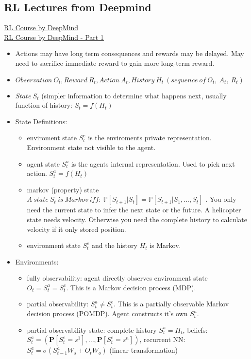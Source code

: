 \subsection{RL Lectures from Deepmind}
\href{https://www.youtube.com/watch?v=2pWv7GOvuf0&list=PLqYmG7hTraZDM-OYHWgPebj2MfCFzFObQ}{RL Course by DeepMind}
\\
\href{https://www.youtube.com/watch?v=2pWv7GOvuf0&list=PLqYmG7hTraZDM-OYHWgPebj2MfCFzFObQ}{RL Course by DeepMind - Part 1}
\begin{itemize}[noitemsep,nolistsep]
	\item Actions may have long term consequences and rewards may be delayed. May need to sacrifice immediate reward to gain more long-term reward.
	\item $Observation\ O_t, Reward\ R_t, Action\ A_t, History\ H_t\ (sequence\ of\ O_t,\ A_t,\ R_t)$
	\item $State\ S_t$ (simpler information to determine what happens next, usually function of history: $S_t = f(H_t)$
	\item State Definitions:
	\begin{itemize}[noitemsep,nolistsep]
		\item enviroment state $S_t^e$ is the enviroments private representation. Environment state not visible to the agent.
		\item agent state $S_t^a$ is the agents internal representation. Used to pick next action. $S_t^a = f(H_t)$
		\item markov (property) state $A\ state\ S_t\ is\ Markov\ iff:\ \mathbb{P}[S_{t+1} | S_t] = \mathbb{P}[S_{t+1}|S_1,...,S_t]$ . You only need the current state to infer the next state or the future. A helicopter state needs velocity. Otherwise you need the complete history to calculate velocity if it only stored position.
		\item environment state $S_t^e$ and the history $H_t$ is Markov.
	\end{itemize} 
	\item Environments:
	\begin{itemize}[noitemsep,nolistsep]
		\item fully observability: agent directly observes environment state $O_t = S_t^a = S_t^e$. This is a Markov decision process (MDP).
		\item partial observability: $S_t^a \neq S_t^e$. This is a partially observable Markov decision process (POMDP). Agent constructs it's own $S_t^a$.
		\item partial observability state: complete history $S_t^a = H_t$, beliefs: $S_t^a = (\mathbf{P}[S_t^e = s^1],...,\mathbf{P}[S_t^e = s^n])$, recurrent NN: $S_t^a = \sigma(S_{t-1}^a W_s + O_t W_o)$ (linear transformation)

\end{itemize}
\end{itemize}
